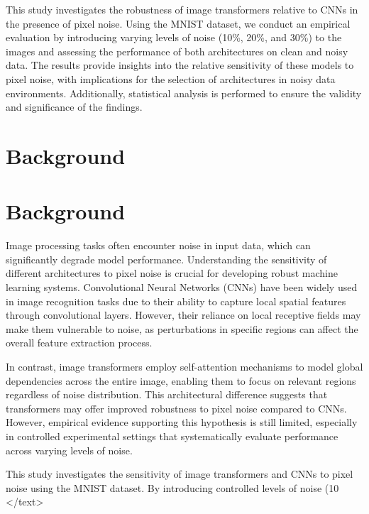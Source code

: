 \documentclass{article}
\begin{document}
This study investigates the robustness of image transformers relative to CNNs in the presence of pixel noise. Using the MNIST dataset, we conduct an empirical evaluation by introducing varying levels of noise (10\%, 20\%, and 30\%) to the images and assessing the performance of both architectures on clean and noisy data. The results provide insights into the relative sensitivity of these models to pixel noise, with implications for the selection of architectures in noisy data environments. Additionally, statistical analysis is performed to ensure the validity and significance of the findings.
\section{Background}
\section*{Background}

Image processing tasks often encounter noise in input data, which can significantly degrade model performance. Understanding the sensitivity of different architectures to pixel noise is crucial for developing robust machine learning systems. Convolutional Neural Networks (CNNs) have been widely used in image recognition tasks due to their ability to capture local spatial features through convolutional layers. However, their reliance on local receptive fields may make them vulnerable to noise, as perturbations in specific regions can affect the overall feature extraction process.

In contrast, image transformers employ self-attention mechanisms to model global dependencies across the entire image, enabling them to focus on relevant regions regardless of noise distribution. This architectural difference suggests that transformers may offer improved robustness to pixel noise compared to CNNs. However, empirical evidence supporting this hypothesis is still limited, especially in controlled experimental settings that systematically evaluate performance across varying levels of noise.

This study investigates the sensitivity of image transformers and CNNs to pixel noise using the MNIST dataset. By introducing controlled levels of noise (10%
</text>
\end{document}
